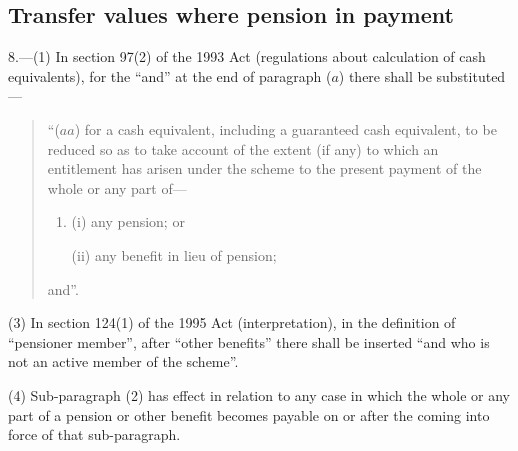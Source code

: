 \documentclass[12pt,a4paper]{article}
\begin{document}
\subsection*{Transfer values where pension in payment}

8.---(1) In section 97(2)  of the 1993 Act (regulations about calculation of cash equivalents), for the “and” at the end of paragraph ($a$)  there shall be substituted—
\begin{quotation}
“($aa$) for a cash equivalent, including a guaranteed cash equivalent, to be reduced so as to take account of the extent (if any) to which an entitlement has arisen under the scheme to the present payment of the whole or any part of—
\begin{enumerate}\item[]
(i) any pension; or

(ii) any benefit in lieu of pension;
\end{enumerate}
and”.
\end{quotation}

%
%

(3) In section 124(1)  of the 1995 Act (interpretation), in the definition of “pensioner member”, after “other benefits” there shall be inserted “and who is not an active member of the scheme”.

(4) Sub-paragraph (2)  has effect in relation to any case in which the whole or any part of a pension or other benefit becomes payable on or after the coming into force of that sub-paragraph.
\end{document}
